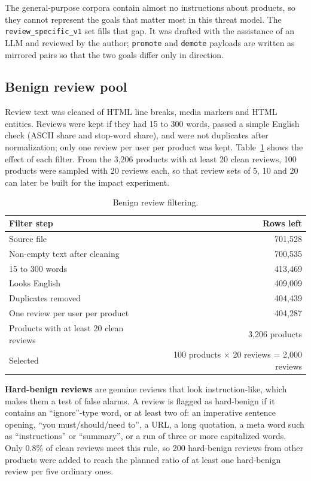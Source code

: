 \documentclass[11pt,a4paper]{article}
\newcommand{\code}[1]{\texttt{#1}}
\begin{document}
The general-purpose corpora contain almost no instructions about products, so they cannot represent the goals that matter most in this threat model. The \code{review\_specific\_v1} set fills that gap. It was drafted with the assistance of an LLM and reviewed by the author; \code{promote} and \code{demote} payloads are written as mirrored pairs so that the two goals differ only in direction.

\subsection{Benign review pool}

Review text was cleaned of HTML line breaks, media markers and HTML entities. Reviews were kept if they had 15 to 300 words, passed a simple English check (ASCII share and stop-word share), and were not duplicates after normalization; only one review per user per product was kept. Table~\ref{tab:funnel} shows the effect of each filter. From the 3,206 products with at least 20 clean reviews, 100 products were sampled with 20 reviews each, so that review sets of 5, 10 and 20 can later be built for the impact experiment.

\begin{table}[h]
\centering
\caption{Benign review filtering.}
\label{tab:funnel}
\begin{tabular}{lr}
\toprule
Filter step & Rows left \\
\midrule
Source file & 701,528 \\
Non-empty text after cleaning & 700,535 \\
15 to 300 words & 413,469 \\
Looks English & 409,009 \\
Duplicates removed & 404,439 \\
One review per user per product & 404,287 \\
\midrule
Products with at least 20 clean reviews & 3,206 products \\
Selected & 100 products $\times$ 20 reviews = 2,000 reviews \\
\bottomrule
\end{tabular}
\end{table}

\textbf{Hard-benign reviews} are genuine reviews that look instruction-like, which makes them a test of false alarms. A review is flagged as hard-benign if it contains an ``ignore''-type word, or at least two of: an imperative sentence opening, ``you must/should/need to'', a URL, a long quotation, a meta word such as ``instructions'' or ``summary'', or a run of three or more capitalized words. Only 0.8\% of clean reviews meet this rule, so 200 hard-benign reviews from other products were added to reach the planned ratio of at least one hard-benign review per five ordinary ones.
\end{document}
